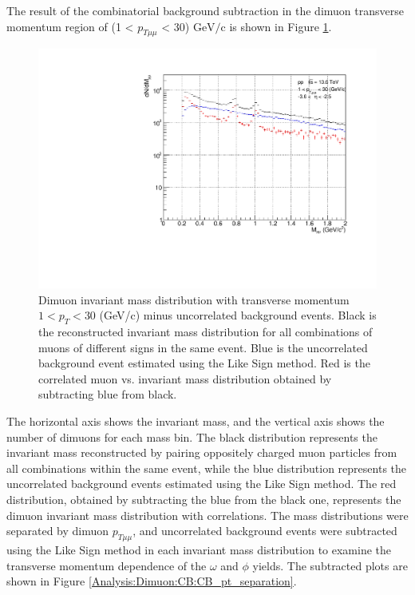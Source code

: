                 The result of the combinatorial background subtraction in the dimuon transverse momentum region of (1 < $p_{T\mu\mu}$ < 30) $\mathrm{GeV/c}$ is shown in Figure \ref{All_pt_CB}.
                \begin{figure}[H]
                    \centering
                    \includegraphics[keepaspectratio, scale=0.5]{fig/3_4_1_CB_pt_1to30.pdf}
                    \caption{Dimuon invariant mass distribution with transverse momentum $1< p_T <30$ (GeV/c) minus uncorrelated background events. Black is the reconstructed invariant mass distribution for all combinations of muons of different signs in the same event. Blue is the uncorrelated background event estimated using the Like Sign method. Red is the correlated muon vs. invariant mass distribution obtained by subtracting blue from black.}
                    \label{All_pt_CB}
                \end{figure}
                The horizontal axis shows the invariant mass, and the vertical axis shows the number of dimuons for each mass bin. The black distribution represents the invariant mass reconstructed by pairing oppositely charged muon particles from all combinations within the same event, while the blue distribution represents the uncorrelated background events estimated using the Like Sign method. The red distribution, obtained by subtracting the blue from the black one, represents the dimuon invariant mass distribution with correlations.
                The mass distributions were separated by dimuon $p_{T\mu\mu}$, and uncorrelated background events were subtracted using the Like Sign method in each invariant mass distribution to examine the transverse momentum dependence of the $\omega$ and $\phi$ yields. The subtracted plots are shown in Figure \ref{Analysis:Dimuon:CB:CB_pt_separation}.

